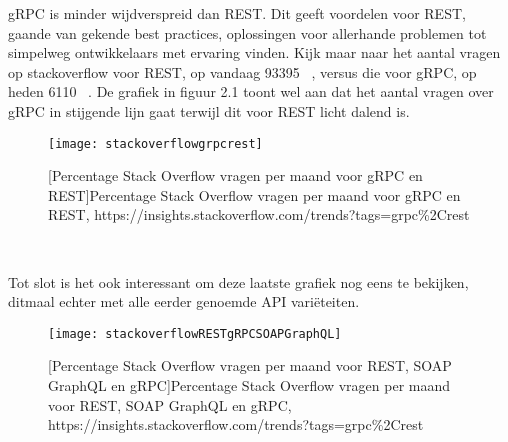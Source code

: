 gRPC is minder wijdverspreid dan REST. Dit geeft voordelen voor REST, gaande van gekende best practices, oplossingen voor allerhande problemen
tot simpelweg ontwikkelaars met ervaring vinden. Kijk maar naar het aantal vragen op stackoverflow voor REST, op vandaag 93395 ~\parencite{stackrest},
versus die voor gRPC, op heden 6110 ~\parencite{stackgrpc}. De grafiek in figuur 2.1 toont wel aan dat het aantal vragen over gRPC in stijgende lijn gaat terwijl
dit voor REST licht dalend is.
\begin{figure}[ht]
    \centering
    \texttt{[image: stackoverflowgrpcrest]}
    \caption{[Percentage Stack Overflow vragen per maand voor gRPC en REST]Percentage Stack Overflow vragen per maand voor gRPC en REST,\newline
        https://insights.stackoverflow.com/trends?tags=grpc\%2Crest}
\end{figure}\\
\nocite{stackoverflowRESTgRPC}

Tot slot is het ook interessant om deze laatste grafiek nog eens te bekijken, ditmaal echter met alle eerder genoemde API vari\"eteiten.

\begin{figure}[ht]
    \centering
    \texttt{[image: stackoverflowRESTgRPCSOAPGraphQL]}
    \caption{[Percentage Stack Overflow vragen per maand voor REST, SOAP GraphQL en gRPC]Percentage Stack Overflow vragen per maand voor REST, SOAP GraphQL en gRPC,\newline
    https://insights.stackoverflow.com/trends?tags=grpc\%2Crest}
\end{figure}
\nocite{stackoverflowRESTgRPCSOAPGraphQL}

